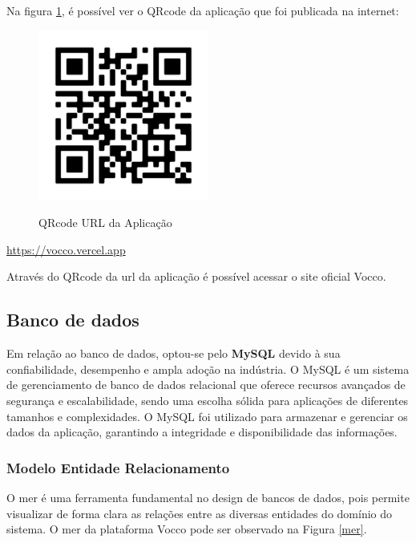 Na figura \ref{aplicação}, é possível ver o QRcode da aplicação que foi publicada na internet:

\begin{figure}[ht]
        \centering
        \href{https://vocco.vercel.app}{\includegraphics[width=0.5\textwidth]{images/qrcode-url-aplicacao.png}}
        \caption{QRcode URL da Aplicação}
        \label{aplicação}
\end{figure}
\href{https://vocco.vercel.app}{https://vocco.vercel.app}

Através do QRcode da \ac{url} da aplicação é possível acessar o site oficial Vocco.

\newpage
\subsection{Banco de dados}
\label{banco}

Em relação ao banco de dados,  optou-se pelo \textbf{MySQL} devido à sua confiabilidade, desempenho e ampla adoção na indústria. O MySQL é um sistema de gerenciamento de banco de dados relacional que oferece recursos avançados de segurança e escalabilidade, sendo uma escolha sólida para aplicações de diferentes tamanhos e complexidades. O MySQL foi utilizado para armazenar e gerenciar os dados da aplicação, garantindo a integridade e disponibilidade das informações.


\subsubsection{Modelo Entidade Relacionamento}

O \ac{mer} é uma ferramenta fundamental no design de bancos de dados, pois permite visualizar de forma clara as relações entre as diversas entidades do domínio do sistema. O \ac{mer} da plataforma Vocco pode ser observado na Figura \ref{mer}.

